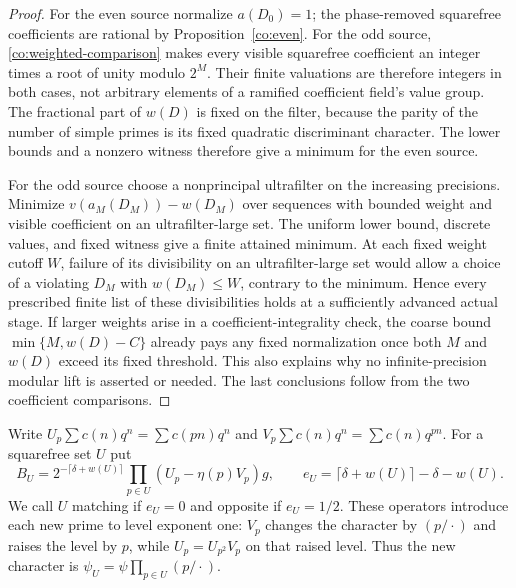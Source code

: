\begin{proof}
For the even source normalize $a(D_0)=1$; the phase-removed squarefree
coefficients are rational by Proposition~\ref{co:even}.  For the odd
source, \eqref{co:weighted-comparison} makes every visible squarefree
coefficient an integer times a root of unity modulo $2^M$.
Their finite valuations are therefore integers in both cases, not
arbitrary elements of a ramified coefficient field's value group.
The fractional part of $w(D)$ is fixed on the filter,
because the parity of the number of simple primes is its fixed
quadratic discriminant character.  The lower bounds and a nonzero
witness therefore give a minimum for the even source.

For the odd source choose a nonprincipal ultrafilter on the increasing
precisions.  Minimize $v(a_M(D_M))-w(D_M)$ over sequences with bounded
weight and visible coefficient on an ultrafilter-large set.  The
uniform lower bound, discrete values, and fixed witness give a finite
attained minimum.  At each fixed weight cutoff $W$, failure of its
divisibility on an ultrafilter-large set would allow a choice of a
violating $D_M$ with $w(D_M)\leq W$, contrary to the minimum.
Hence every prescribed finite list of these divisibilities holds at
a sufficiently advanced actual stage.  If larger weights arise in a
coefficient-integrality check, the coarse bound
$\min\{M,w(D)-C\}$ already pays any fixed normalization once both
$M$ and $w(D)$ exceed its fixed threshold.  This also explains why
no infinite-precision modular lift is asserted or needed.
The last conclusions follow from the two coefficient comparisons.
\end{proof}

Write $U_p\sum c(n)q^n=\sum c(pn)q^n$ and
$V_p\sum c(n)q^n=\sum c(n)q^{pn}$.  For a squarefree set $U$ put
\begin{equation}\label{co:BU}
 B_U=2^{-\lceil\delta+w(U)\rceil}
       \prod_{p\in U}(U_p-\eta(p)V_p)g,\qquad
 e_U=\lceil\delta+w(U)\rceil-\delta-w(U).
\end{equation}
We call $U$ matching if $e_U=0$ and opposite if $e_U=1/2$.
These operators introduce each new prime to level exponent one:
$V_p$ changes the character by $(p/\cdot)$ and raises the level by
$p$, while $U_p=U_{p^2}V_p$ on that raised level.
Thus the new character is $\psi_U=\psi\prod_{p\in U}(p/\cdot)$.


